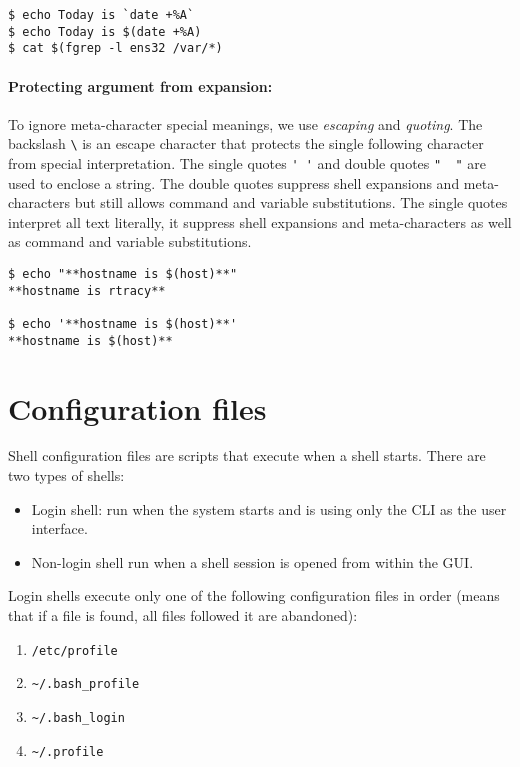 \begin{verbatim}
$ echo Today is `date +%A`
$ echo Today is $(date +%A)
$ cat $(fgrep -l ens32 /var/*)
\end{verbatim}

\paragraph{Protecting argument from expansion:} To ignore meta-character special meanings, we use \emph{escaping} and \emph{quoting}. The backslash \verb|\| is an escape character that protects the single following character from special interpretation. The single quotes \verb|' '| and double quotes \verb|"  "| are used to enclose a string. The double quotes suppress shell expansions and meta-characters but still allows command and variable substitutions. The single quotes interpret all text literally, it suppress shell expansions and meta-characters as well as command and variable substitutions. 

\begin{verbatim}
$ echo "**hostname is $(host)**"
**hostname is rtracy**

$ echo '**hostname is $(host)**'
**hostname is $(host)**
\end{verbatim}

\section{Configuration files}

Shell configuration files are scripts that execute when a shell starts. There are two types of shells:

\begin{itemize}
\item Login shell: run when the system starts and is using only the CLI as the user interface.
\item Non-login shell run when a shell session is opened from within the GUI. 
\end{itemize}

Login shells execute only one of the following configuration files in order (means that if a file is found, all files followed it are abandoned):

\begin{enumerate}
\item \verb|/etc/profile|
\item \verb|~/.bash_profile|
\item \verb|~/.bash_login|
\item \verb|~/.profile|
\end{enumerate}

